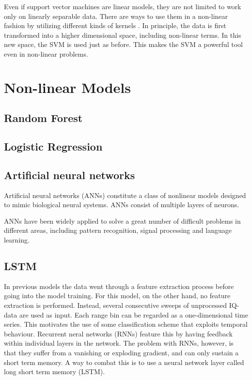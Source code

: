 Even if support vector machines are linear models, they are not limited to work only on linearly separable data. There are ways to use them in a non-linear fashion by utilizing different kinds of kernels \citep{xia_2016}. In principle, the data is first transformed into a higher dimensional space, including non-linear terms. In this new space, the SVM is used just as before. This makes the SVM a powerful tool even in non-linear problems.

\section{Non-linear Models}

\subsection*{Random Forest}

\subsection*{Logistic Regression}

\subsection*{Artificial neural networks}

Artificial neural networks (ANNs) constitute a class of nonlinear models designed to mimic biological neural systems. ANNs consist of multiple layers of neurons. 


ANNs have been widely applied to solve a great number of difficult problems in different areas, including pattern recognition, signal processing and language learning. 


\subsection*{LSTM}
In previous models the data went through a feature extraction process before going into the model training. For this model, on the other hand, no feature extraction is performed. Instead, several consecutive sweeps of unprocessed IQ-data are used as input. Each range bin can be regarded as a one-dimensional time series. This motivates the use of some classification scheme that exploits temporal behaviour. Recurrent neral networks (RNNs) feature this by having feedback within individual layers in the network. \citep{karim_majumdar_darabi_chen_2018} The problem with RNNs, however, is that they suffer from a vanishing or exploding gradient, and can only sustain a short term memory. A way to combat this is to use a neural network layer called long short term memory (LSTM).


